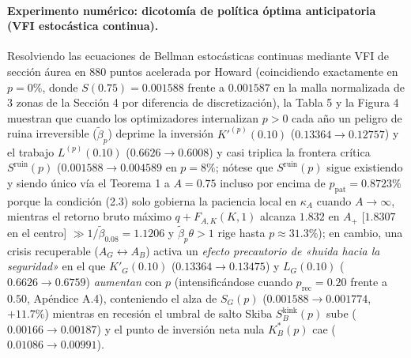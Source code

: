 \documentclass[11pt,letterpaper]{article}
\theoremstyle{plain}
\begin{document}
\paragraph{Experimento numérico: dicotomía de política óptima anticipatoria (VFI estocástica continua).}
Resolviendo las ecuaciones de Bellman estocásticas continuas mediante VFI de sección áurea en $880$ puntos acelerada por Howard (coincidiendo exactamente en $p=0\%$, donde $S(0.75)=0.001588$ frente a $0.001587$ en la malla normalizada de $3$ zonas de la Sección 4 por diferencia de discretización), la Tabla 5 y la Figura 4 muestran que cuando los optimizadores internalizan $p>0$ cada año un peligro de ruina irreversible ($\tilde{\beta}_p$) deprime la inversión $K'^{(p)}(0.10)$ ($0.13364\to 0.12757$) y el trabajo $L^{(p)}(0.10)$ ($0.6626\to 0.6008$) y casi triplica la frontera crítica $S^{\mathrm{ruin}}(p)$ ($0.001588\to 0.004589$ en $p=8\%$; nótese que $S^{\mathrm{ruin}}(p)$ sigue existiendo y siendo único vía el Teorema 1 a $A=0.75$ incluso por encima de $p_{\mathrm{pat}}=0.8723\%$ porque la condición (2.3) solo gobierna la paciencia local en $\kappa_A$ cuando $A\to\infty$, mientras el retorno bruto máximo $q+F_{A,K}(K,1)$ alcanza $1.832$ en $A_+$ [$1.8307$ en el centro] $\gg 1/\tilde{\beta}_{0.08}=1.1206$ y $\tilde{\beta}_p\theta>1$ rige hasta $p\approx 31.3\%$); en cambio, una crisis recuperable ($A_G\leftrightarrow A_B$) activa un \emph{efecto precautorio de «huida hacia la seguridad»} en el que $K'_G(0.10)$ ($0.13364\to 0.13475$) y $L_G(0.10)$ ($0.6626\to 0.6759$) \emph{aumentan} con $p$ (intensificándose cuando $p_{\mathrm{rec}}=0.20$ frente a $0.50$, Apéndice A.4), conteniendo el alza de $S_G(p)$ ($0.001588\to 0.001774$, $+11.7\%$) mientras en recesión el umbral de salto Skiba $S_B^{\mathrm{kink}}(p)$ sube ($0.00166\to 0.00187$) y el punto de inversión neta nula $K_B^*(p)$ cae ($0.01086\to 0.00991$).
\end{document}
